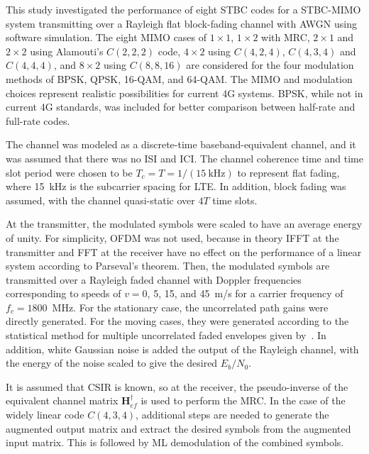 

This study investigated the performance of eight STBC codes for a STBC-MIMO system transmitting over a Rayleigh flat block-fading channel with AWGN using software simulation. The eight MIMO cases of $1\times1$, $1\times2$ with MRC, $2\times1$ and $2\times2$ using Alamouti's $C(2,2,2)$ code, $4\times2$ using $C(4,2,4)$, $C(4,3,4)$ and $C(4,4,4)$, and $8\times2$ using $C(8,8,16)$ are considered for the four modulation methods of BPSK, QPSK, 16-QAM, and 64-QAM. The MIMO and modulation choices represent realistic possibilities for current 4G systems. BPSK, while not in current 4G standards, was included for better comparison between half-rate and full-rate codes.

The channel was modeled as a discrete-time baseband-equivalent channel, and it was assumed that there was no ISI and ICI. The channel coherence time and time slot period were chosen to be $T_c=T=1/(15~\text{kHz})$ to represent flat fading, where 15~kHz is the subcarrier spacing for LTE. In addition, block fading was assumed, with the channel quasi-static over $4T$ time slots.

At the transmitter, the modulated symbols were scaled to have an average energy of unity. For simplicity, OFDM was not used, because in theory IFFT at the transmitter and FFT at the receiver have no effect on the performance of a linear system according to Parseval's theorem. Then, the modulated symbols are transmitted over a Rayleigh faded channel with Doppler frequencies corresponding to speeds of $v={}$0, 5, 15, and 45~m/s for a carrier frequency of $f_c=1800$~MHz. For the stationary case, the uncorrelated path gains were directly generated. For the moving cases, they were generated according to the statistical method for multiple uncorrelated faded envelopes given by~\cite{stuber12}. In addition, white Gaussian noise is added the output of the Rayleigh channel, with the energy of the noise scaled to give the desired $E_b/N_0$.

It is assumed that CSIR is known, so at the receiver, the pseudo-inverse of the equivalent channel matrix $\bm{H}_{ef}^\dagger$ is used to perform the MRC. In the case of the widely linear code $C(4,3,4)$, additional steps are needed to generate the augmented output matrix and extract the desired symbols from the augmented input matrix. This is followed by ML demodulation of the combined symbols.

